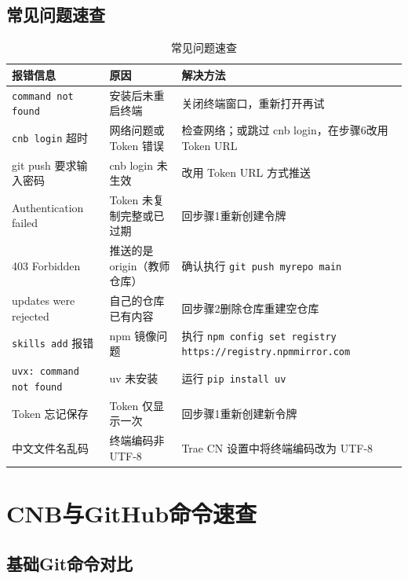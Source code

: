 \section{常见问题速查}

\begin{table}[H]
\centering
\small
\begin{tabular}{p{4cm}p{3.5cm}p{5.5cm}}
\toprule
\textbf{报错信息} & \textbf{原因} & \textbf{解决方法} \\
\midrule
\texttt{command not found} & 安装后未重启终端 & 关闭终端窗口，重新打开再试 \\
\texttt{cnb login} 超时 & 网络问题或 Token 错误 & 检查网络；或跳过 cnb login，在步骤6改用 Token URL \\
git push 要求输入密码 & cnb login 未生效 & 改用 Token URL 方式推送 \\
Authentication failed & Token 未复制完整或已过期 & 回步骤1重新创建令牌 \\
403 Forbidden & 推送的是 origin（教师仓库） & 确认执行 \texttt{git push myrepo main} \\
updates were rejected & 自己的仓库已有内容 & 回步骤2删除仓库重建空仓库 \\
\texttt{skills add} 报错 & npm 镜像问题 & 执行 \texttt{npm config set registry https://registry.npmmirror.com} \\
\texttt{uvx: command not found} & uv 未安装 & 运行 \texttt{pip install uv} \\
Token 忘记保存 & Token 仅显示一次 & 回步骤1重新创建新令牌 \\
中文文件名乱码 & 终端编码非 UTF-8 & Trae CN 设置中将终端编码改为 UTF-8 \\
\bottomrule
\end{tabular}
\caption{常见问题速查}
\end{table}


\chapter{CNB与GitHub命令速查}

\section{基础Git命令对比}


